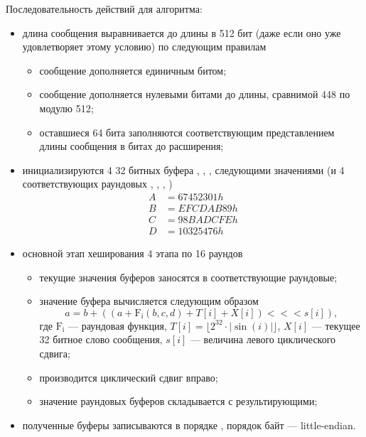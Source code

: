 Последовательность действий для алгоритма:
\begin{itemize}
    \item длина сообщения выравнивается до длины в 512 бит (даже если оно
          уже удовлетворяет этому условию) по следующим правилам
          \begin{itemize}
              \item сообщение дополняется единичным битом;
              \item сообщение дополняется нулевыми битами до длины,
                    сравнимой 448 по модулю 512;
              \item оставшиеся 64 бита заполняются соответствующим
                    представлением длины сообщения в битах до расширения;
          \end{itemize}
    \item инициализируются 4 32 битных буфера , , ,
           следующими значениями (и 4 соответствующих раундовых
          , , , )
          \begin{align*}
            A & = 67452301h \\
            B & = EFCDAB89h \\
            C & = 98BADCFEh \\
            D & = 10325476h
          \end{align*}
    \item основной этап хеширования 4 этапа по 16 раундов
          \begin{itemize}
              \item текущие значения буферов заносятся в соответствующие
                    раундовые;
              \item значение буфера  вычисляется следующим образом
                    \begin{equation*}
                        a = b + ((a + \mathrm{F_i}(b, c, d) + T[i] + X[i]) <<< s[i]),
                    \end{equation*}
                    где $\mathrm{F_i}$ --- раундовая функция,
                    $T[i] = \lfloor 2 ^ 32 \cdot |\sin(i)| \rfloor$,
                    $X[i]$ --- текущее 32 битное слово сообщения,
                    $s[i]$ --- величина левого циклического сдвига;
              \item производится циклический сдвиг вправо;
              \item значение раундовых буферов складывается с результирующими;
          \end{itemize}
    \item полученные буферы записываются в порядке , порядок байт
          --- little-endian.
\end{itemize}

